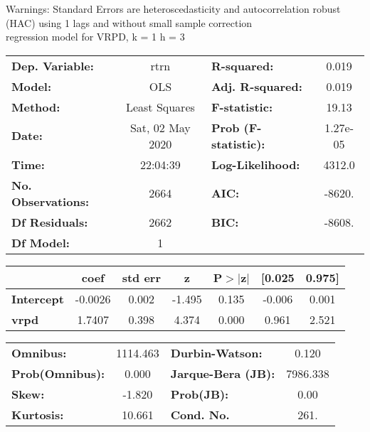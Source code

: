 Warnings: \newline
 [1] Standard Errors are heteroscedasticity and autocorrelation robust (HAC) using 1 lags and without small sample correction\\ 

regression model for VRPD, k = 1 h = 3\begin{center}
\begin{tabular}{lclc}
\toprule
\textbf{Dep. Variable:}    &       rtrn       & \textbf{  R-squared:         } &     0.019   \\
\textbf{Model:}            &       OLS        & \textbf{  Adj. R-squared:    } &     0.019   \\
\textbf{Method:}           &  Least Squares   & \textbf{  F-statistic:       } &     19.13   \\
\textbf{Date:}             & Sat, 02 May 2020 & \textbf{  Prob (F-statistic):} &  1.27e-05   \\
\textbf{Time:}             &     22:04:39     & \textbf{  Log-Likelihood:    } &    4312.0   \\
\textbf{No. Observations:} &        2664      & \textbf{  AIC:               } &    -8620.   \\
\textbf{Df Residuals:}     &        2662      & \textbf{  BIC:               } &    -8608.   \\
\textbf{Df Model:}         &           1      & \textbf{                     } &             \\
\bottomrule
\end{tabular}
\begin{tabular}{lcccccc}
                   & \textbf{coef} & \textbf{std err} & \textbf{z} & \textbf{P$> |$z$|$} & \textbf{[0.025} & \textbf{0.975]}  \\
\midrule
\textbf{Intercept} &      -0.0026  &        0.002     &    -1.495  &         0.135        &       -0.006    &        0.001     \\
\textbf{vrpd}      &       1.7407  &        0.398     &     4.374  &         0.000        &        0.961    &        2.521     \\
\bottomrule
\end{tabular}
\begin{tabular}{lclc}
\textbf{Omnibus:}       & 1114.463 & \textbf{  Durbin-Watson:     } &    0.120  \\
\textbf{Prob(Omnibus):} &   0.000  & \textbf{  Jarque-Bera (JB):  } & 7986.338  \\
\textbf{Skew:}          &  -1.820  & \textbf{  Prob(JB):          } &     0.00  \\
\textbf{Kurtosis:}      &  10.661  & \textbf{  Cond. No.          } &     261.  \\
\bottomrule
\end{tabular}
\end{center}

